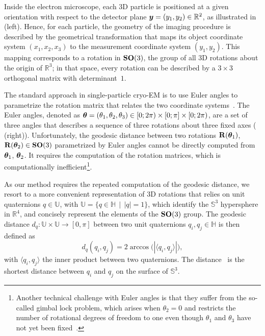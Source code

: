 Inside the electron microscope, each 3D particle is positioned at a given orientation with respect to the detector plane ${\boldsymbol{y}}=(y_1,y_2)\in \mathbb{R}^2$, as illustrated in  (left). Hence, for each particle, the geometry of the imaging procedure is described by the geometrical transformation that maps its object coordinate system $(x_1,x_2,x_3)$ to the measurement coordinate system $(y_1,y_2)$. This mapping corresponds to a rotation in $\mathrm{\mathbf{SO}}(3)$, the group of all 3D rotations about the origin of $\mathbb{R}^3$; in that space, every rotation can be described by a $3\times3$ orthogonal matrix with determinant~$1$.

The standard approach in single-particle cryo-EM is to use Euler angles to parametrize the rotation matrix that relates the two coordinate systems~\cite{sorzano2014interchanging}. The Euler angles, denoted as ${\boldsymbol{\theta}}=(\theta_1,\theta_2,\theta_3)\in [0;2\pi)\times [0;\pi] \times [0;2\pi)$, are a set of three angles that describes a sequence of three rotations about three fixed axes ( (right)).
Unfortunately, the geodesic distance between two rotations $\mathbf{R}({\boldsymbol{\theta}}_1)$, $\mathbf{R}({\boldsymbol{\theta}}_2)\in \mathrm{\mathbf{SO}}(3)$ parametrized by Euler angles cannot be directly computed from ${\boldsymbol{\theta}}_1$, ${\boldsymbol{\theta}}_2$.
It requires the computation of the rotation matrices, which is computationally inefficient\footnote{Another technical challenge with Euler angles is that they suffer from the so-called gimbal lock problem, which arises when $\theta_2=0$ and restricts the number of rotational degrees of freedom to one even though $\theta_1$ and $\theta_3$ have not yet been fixed~\cite{koks2006explorations}.}.

As our method requires the repeated computation of the geodesic distance, we resort to a more convenient representation of 3D rotations that relies on unit quaternions $q\in\mathbb{U}$, with  $\mathbb{U}=\big\{q\in\mathbb{H} \; \, | \; \,\lvert q \rvert =1\big\}$, which identify the $\mathbb{S}^3$ hypersphere in  $\mathbb{R}^4$, and concisely represent the elements of the $\mathrm{\mathbf{SO}}(3)$ group. The geodesic distance $d_q:\mathbb{U}\times\mathbb{U}\rightarrow [0,\pi]$ between two unit quaternions $q_i, q_j\in\mathbb{H}$ is then defined as
\begin{equation}
    d_q(q_i, q_j) = 2 \arccos \big(| \langle q_i, q_j \rangle| \big),
    \label{eqn:distance:orientations}
\end{equation}
with $\langle q_i, q_j \rangle$ the inner product between two quaternions.
The distance~ is the shortest distance between $q_i$ and $q_j$ on the surface of $\mathbb{S}^3$.

